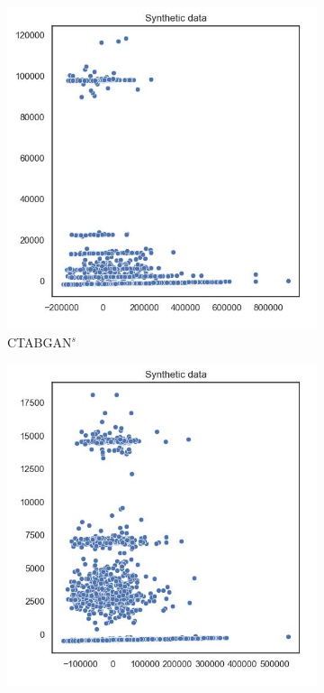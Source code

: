\begin{figure}[h]
	\centering
	\begin{subfigure}{0.3\textwidth}
		\includegraphics[width=\textwidth]{images/pca/ctabgan_simTune.jpg}
		\caption{CTABGAN$^s$}
	\end{subfigure}
    \begin{subfigure}{0.3\textwidth}
        \includegraphics[width=\textwidth]{images/pca/tvae_simTune.jpg}

\end{subfigure}
\end{figure}
